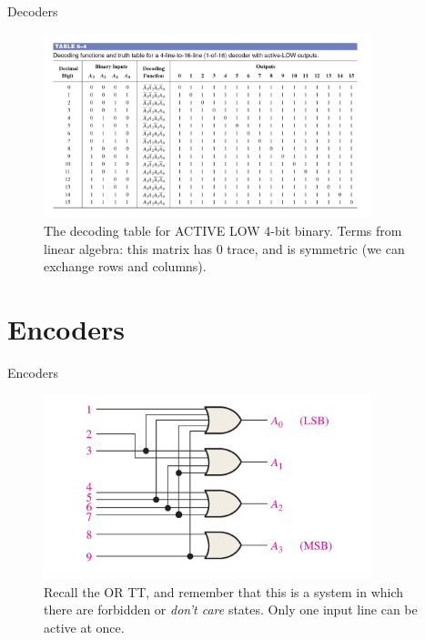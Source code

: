 \documentclass{beamer}
\begin{document}
\begin{frame}{Decoders}
\begin{figure}
\centering
\includegraphics[width=0.85\textwidth]{figures/decoder3.pdf}
\caption{\label{fig:decoder3} The decoding table for ACTIVE LOW 4-bit binary.  Terms from linear algebra: this matrix has 0 trace, and is symmetric (we can exchange rows and columns).}
\end{figure}
\end{frame}

\section{Encoders}

\begin{frame}{Encoders}
\begin{figure}
\centering
\includegraphics[width=0.85\textwidth]{figures/encoder1.pdf}
\caption{\label{fig:encoder1} Recall the OR TT, and remember that this is a system in which there are forbidden or \textit{don't care} states.  Only one input line can be active at once.}
\end{figure}
\end{frame}
\end{document}
